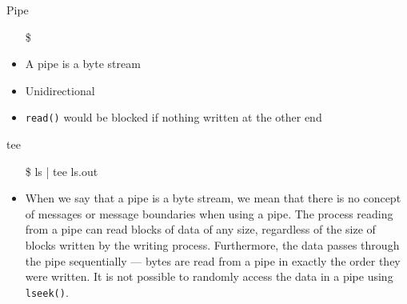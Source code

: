 \begin{frame}{Pipe}
  \begin{itemize}
  \item[\$] 
  \end{itemize}
  \begin{center}
  \end{center}
  \begin{itemize}
  \item A pipe is a byte stream
  \item Unidirectional
  \item \texttt{read()} would be blocked if nothing written at the other end
  \end{itemize}
  \ttfamily
  \begin{block}{tee}
    \begin{center}
      \begin{minipage}{.35\linewidth}
        \begin{itemize}
        \item[\$] ls | tee ls.out
        \end{itemize}
      \end{minipage}\quad
      \begin{minipage}{.55\linewidth}
      \end{minipage}
    \end{center}
  \end{block}
\end{frame}

\begin{itemize}
\item When we say that a pipe is a byte stream, we mean that there is no concept of
  messages or message boundaries when using a pipe. The process reading from a pipe can
  read blocks of data of any size, regardless of the size of blocks written by the writing
  process. Furthermore, the data passes through the pipe sequentially --- bytes are read from
  a pipe in exactly the order they were written. It is not possible to randomly access the
  data in a pipe using \texttt{lseek()}. 
\end{itemize}


